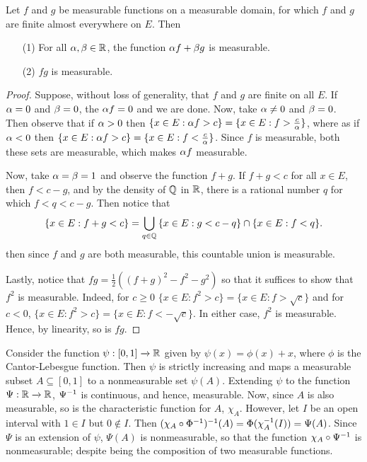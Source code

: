 \begin{theorem}\label{3.1.5}
    Let $f$ and  $g$ be measurable functions on a measurable domain, for which
    $f$ and  $g$ are finite almost everywhere on  $E$. Then
    \begin{enumerate}
        \item[(1)] For all $\alpha,\beta \in \mathbb{R}$, the function $\alpha f+\beta g$ is
            measurable.

        \item[(2)] $fg$ is measurable.
    \end{enumerate}
\end{theorem}
\begin{proof}
    Suppose, without loss of generality, that $f$ and  $g$ are finite on all
    $E$. If  $\alpha=0$ and  $\beta=0$, the  $\alpha f=0$ and we are done. Now, take
    $\alpha \neq 0$ and  $\beta=0$. Then observe that if  $\alpha>0$ then  $\{x \in E :
    \alpha f>c\}=\{x \in E : f>\frac{c}{\alpha}\}$, where as if $\alpha<0$ then  $\{x \in
    E : \alpha f>c\}=\{x \in E : f<\frac{c}{\alpha}\}$. Since $f$ is measurable, both
    these sets are measurable, which makes  $\alpha f$ measurable.

    Now, take  $\alpha=\beta=1$ and observe the function  $f+g$. If  $f+g<c$ for all
     $x \in E$, then  $f<c-g$, and by the density of  $\mathbb{Q}$ in  $\mathbb{R}$,  there is a
     rational number $q$ for which  $f<q<c-g$. Then notice that
     \begin{equation*}
         \{x \in E : f+g<c\}=\bigcup_{q \in \mathbb{Q}}{\{x \in E : g<c-q\} \cap \{x \in
         E : f<q\}}.
     \end{equation*}
     then since $f$ and  $g$ are both measurable, this countable union is
     measurable.

     Lastly, notice that  $fg=\frac{1}{2}((f+g)^2-f^2-g^2)$ so that it suffices
     to show that $f^2$ is measurable. Indeed, for  $c \geq 0$  $\{x \in E :
     f^2>c\}=\{x \in E : f>\sqrt{c}\}$ and for $c<0$,  $\{x \in E : f^2>c\}=\{x
     \in E : f<-\sqrt{c}\}$. In either case, $f^2$ is measurable. Hence, by
     linearity, so is  $fg$.
\end{proof}

\begin{example}\label{example_3.2}
    Consider the function $\psi:[0,1] \xrightarrow{} \mathbb{R}$ given by
    $\psi(x)=\phi(x)+x$, where $\phi$ is the Cantor-Lebesgue function. Then
    $\psi$ is strictly increasing and maps a measurable subset  $A \subseteq
    [0,1]$ to a nonmeasurable set $\psi(A)$. Extending $\psi$ to the function
    $\Psi:\mathbb{R} \xrightarrow{} \mathbb{R}$, $\Psi^{-1}$ is continuous, and hence,
    measurable. Now, since $A$ is also measurable, so is the characteristic
    function for  $A$,  $\chi_A$. However, let $I$ be an open interval with  $1
    \in I$ but  $0 \notin I$. Then $(\chi_A \circ
    \Phi^{-1})^{-1}(A)=\Phi(\chi_A^{-1}(I))=\Psi(A)$. Since $\Psi$ is an extension
    of  $\psi$,  $\Psi(A)$ is nonmeasurable, so that the function $\chi_A \circ
    \Psi^{-1}$ is nonmeasurable; despite being the composition of two
    measurable functions.
\end{example}

